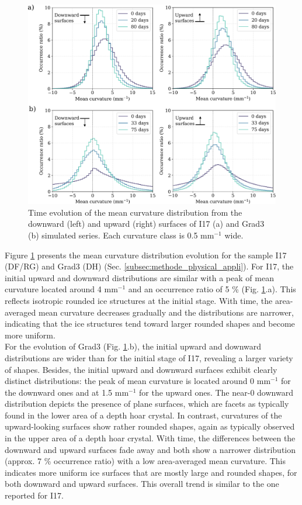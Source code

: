 \documentclass[draft,ms]{agujournal2019}
\begin{document}
\begin{figure}
    \centering
    \includegraphics[width=\linewidth]{Figures/histo_i17_grad3_copie_invert.pdf}
    \caption{Time evolution of the mean curvature distribution from the downward (left) and upward (right) surfaces of I17 (a) and Grad3 (b) simulated series. Each curvature class is 0.5 mm$^{-1}$ wide.}
    \label{fig:histo_i17_grad3}
\end{figure}

Figure \ref{fig:histo_i17_grad3} presents the mean curvature distribution evolution for the sample I17 (DF/RG) and Grad3 (DH) (Sec. \ref{subsec:methode_physical_appli}). For I17, the initial upward and downward distributions are similar with a peak of mean curvature located around 4 mm$^{-1}$ and an occurrence ratio of 5 \% (Fig. \ref{fig:histo_i17_grad3}.a). This reflects isotropic rounded ice structures at the initial stage. With time, the area-averaged mean curvature decreases gradually and the distributions are narrower, indicating that the ice structures tend toward larger rounded shapes and become more uniform.\\

For the evolution of Grad3 (Fig. \ref{fig:histo_i17_grad3}.b), the initial upward and downward distributions are wider than for the initial stage of I17, revealing a larger variety of shapes. Besides, the initial upward and downward surfaces exhibit clearly distinct distributions: the peak of mean curvature is located around 0 mm$^{-1}$ for the downward ones and at 1.5 mm$^{-1}$ for the upward ones. The near-0 downward distribution depicts the presence of plane surfaces, which are facets as typically found in the lower area of a depth hoar crystal. In contrast, curvatures of the upward-looking surfaces show rather rounded shapes, again as typically observed in the upper area of a depth hoar crystal. With time, the differences between the downward and upward surfaces fade away and both show a narrower distribution (approx. 7 \% occurrence ratio) with a low area-averaged mean curvature. This indicates more uniform ice surfaces that are mostly large and rounded shapes, for both downward and upward surfaces. This overall trend is similar to the one reported for I17.\\
\end{document}
